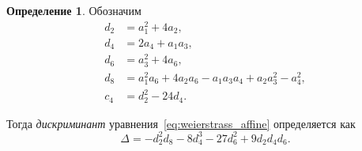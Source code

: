 \documentclass[12pt]{article}
\theoremstyle{definition}
\newtheorem{definition}[theorem]{Определение}
\theoremstyle{definition}
\theoremstyle{definition}
\begin{document}
\begin{definition}
Обозначим
\begin{equation}
\begin{split}
d_2 &= a_1^2 + 4a_2, \\
d_4 &= 2a_4 + a_1a_3, \\
d_6 &= a_3^2 + 4a_6, \\
d_8 &= a_1^2a_6 + 4a_2a_6 - a_1a_3a_4 + a_2a_3^2 - a_4^2, \\
c_4 &= d_2^2 - 24d_4.
\end{split}
\end{equation}

Тогда \textit{дискриминант} уравнения~\eqref{eq:weierstrass_affine} определяется как 
\[
\Delta = -d_2^2d_8 - 8d_4^3-27d_6^2+9d_2d_4d_6.
\]
\end{definition}
            
\end{document}
